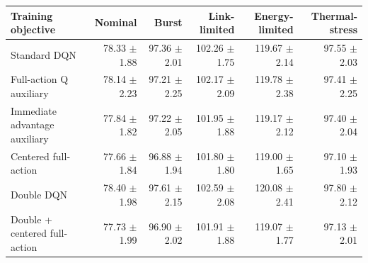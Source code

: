 \begin{tabular}{lrrrrr}
\toprule
Training objective & Nominal & Burst & Link-limited & Energy-limited & Thermal-stress \\
\midrule
Standard DQN & 78.33 $\pm$ 1.88 & 97.36 $\pm$ 2.01 & 102.26 $\pm$ 1.75 & 119.67 $\pm$ 2.14 & 97.55 $\pm$ 2.03 \\
Full-action Q auxiliary & 78.14 $\pm$ 2.23 & 97.21 $\pm$ 2.25 & 102.17 $\pm$ 2.09 & 119.78 $\pm$ 2.38 & 97.41 $\pm$ 2.25 \\
Immediate advantage auxiliary & 77.84 $\pm$ 1.82 & 97.22 $\pm$ 2.05 & 101.95 $\pm$ 1.88 & 119.17 $\pm$ 2.12 & 97.40 $\pm$ 2.04 \\
Centered full-action & 77.66 $\pm$ 1.84 & 96.88 $\pm$ 1.94 & 101.80 $\pm$ 1.80 & 119.00 $\pm$ 1.65 & 97.10 $\pm$ 1.93 \\
Double DQN & 78.40 $\pm$ 1.98 & 97.61 $\pm$ 2.15 & 102.59 $\pm$ 2.08 & 120.08 $\pm$ 2.41 & 97.80 $\pm$ 2.12 \\
Double + centered full-action & 77.73 $\pm$ 1.99 & 96.90 $\pm$ 2.02 & 101.91 $\pm$ 1.88 & 119.07 $\pm$ 1.77 & 97.13 $\pm$ 2.01 \\
\bottomrule
\end{tabular}
